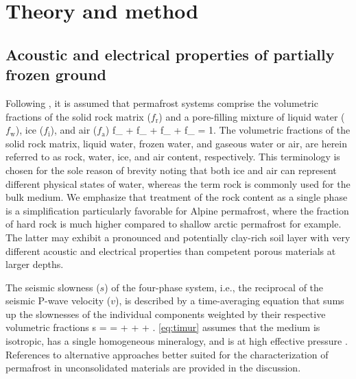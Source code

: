 \documentclass[extra]{gji}
\let\oldequation\equation
\let\oldendequation\endequation
\renewenvironment{equation}
  {\linenomathNonumbers\oldequation}
  {\oldendequation\endlinenomath}
\begin{document}
\section{Theory and method}
\subsection{Acoustic and electrical properties of partially frozen ground}

Following \citet{Hauck2011}, it is assumed that permafrost systems comprise the volumetric fractions of the solid rock matrix ($f_\text{r}$) and a pore-filling mixture of liquid water ($f_\text{w}$), ice ($f_\text{i}$), and air ($f_\text{a}$)
%
\begin{equation}\label{eq:sum}
 f_ + f_ + f_ + f_ = 1.
\end{equation}
%
The volumetric fractions of the solid rock matrix, liquid water, frozen water, and gaseous water or air, are herein referred to as rock, water, ice, and air content, respectively.
This terminology is chosen for the sole reason of brevity noting that both ice and air can represent different physical states of water, whereas the term rock is commonly used for the bulk medium.
We emphasize that treatment of the rock content as a single phase is a simplification particularly favorable for Alpine permafrost, where the fraction of hard rock is much higher compared to shallow arctic permafrost for example.
The latter may exhibit a pronounced and potentially clay-rich soil layer with very different acoustic and electrical properties than competent porous materials at larger depths.

The seismic slowness ($s$) of the four-phase system, i.e., the reciprocal of the seismic P-wave velocity ($v$), is described by a time-averaging equation that sums up the slownesses of the individual components weighted by their respective volumetric fractions \citep[e.g.,][]{Timur1968}
%
\begin{equation}\label{eq:timur}
 s =  =  +  +  + .
\end{equation}
%
\autoref{eq:timur} assumes that the medium is isotropic, has a single homogeneous mineralogy, and is at high effective pressure \citep[e.g.,][]{Mavko2009}.
References to alternative approaches better suited for the characterization of permafrost in unconsolidated materials are provided in the discussion.
\end{document}
